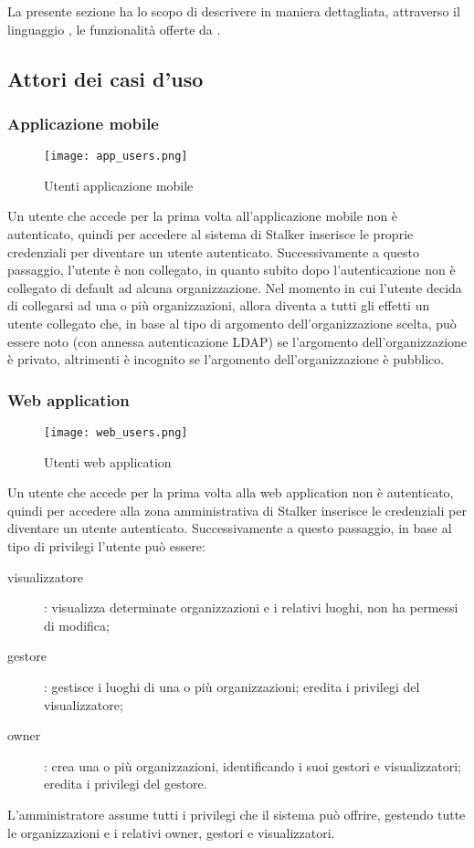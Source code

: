 \documentclass[../analisi-dei-requisiti.tex]{subfiles}
\begin{document}
La presente sezione ha lo scopo di descrivere in maniera dettagliata, attraverso il linguaggio , le funzionalità offerte da .

\subsection{Attori dei casi d'uso}%
\label{sub:attori_casi_duso}

\subsubsection{Applicazione mobile}%
\label{subs:mobile_app}

\begin{figure}[H]
  \centering
  \texttt{[image: app\_users.png]}
  \caption{Utenti applicazione mobile}%
  \label{fig:usersapp}
\end{figure}

Un utente che accede per la prima volta all'applicazione mobile non è autenticato, quindi per accedere al sistema di Stalker inserisce le proprie credenziali per diventare un utente autenticato.
Successivamente a questo passaggio, l'utente è non collegato, in quanto subito dopo l'autenticazione non è collegato di default ad alcuna organizzazione. Nel momento in cui l'utente decida di collegarsi ad una o più organizzazioni, allora
diventa a tutti gli effetti un utente collegato che, in base al tipo di argomento dell'organizzazione scelta, può essere noto (con annessa autenticazione LDAP) se l'argomento dell'organizzazione è privato, altrimenti è incognito se l'argomento dell'organizzazione è pubblico.

\subsubsection{Web application}%
\label{subs:web_application}

\begin{figure}[H]
  \centering
  \texttt{[image: web\_users.png]}
  \caption{Utenti web application}%
  \label{fig:usersweb}
\end{figure}

Un utente che accede per la prima volta alla web application non è autenticato, quindi per accedere alla zona amministrativa di Stalker inserisce le
credenziali per diventare un utente autenticato.
Successivamente a questo passaggio, in base al tipo di privilegi l'utente può essere:
\begin{description}
  \item[visualizzatore]: visualizza determinate organizzazioni e i relativi luoghi, non ha permessi di modifica;
  \item[gestore]: gestisce i luoghi di una o più organizzazioni; eredita i privilegi del visualizzatore;
  \item[owner]: crea una o più organizzazioni, identificando i suoi gestori e visualizzatori; eredita i privilegi del gestore.
\end{description}
L'amministratore assume tutti i privilegi che il sistema può offrire, gestendo tutte le organizzazioni e i relativi owner, gestori e visualizzatori.
\end{document}
